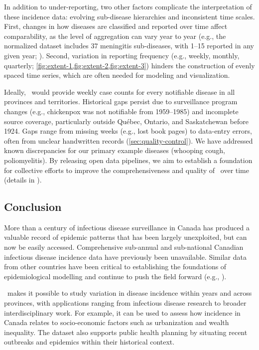 \documentclass[12pt]{article}
\begin{document}
In addition to under-reporting, two other factors complicate the interpretation of these incidence data: evolving sub-disease hierarchies and inconsistent time scales. First, changes in how diseases are classified and reported over time affect comparability, as the level of aggregation can vary year to year (e.g., the normalized dataset includes 37 meningitis sub-diseases, with 1--15 reported in any given year; ). Second, variation in reporting frequency (e.g., weekly, monthly, quarterly; \cref{fig:extent-1,fig:extent-2,fig:extent-3}) hinders the construction of evenly spaced time series, which are often needed for modeling and visualization.

Ideally, \datacronym\ would provide weekly case counts for every notifiable \cite{doherty2000establishing} disease in all provinces and territories. Historical gaps persist due to surveillance program changes (e.g., chickenpox was not notifiable from 1959--1985) and incomplete source coverage, particularly outside Québec, Ontario, and Saskatchewan before 1924. Gaps range from missing weeks (e.g., lost book pages) to data-entry errors, often from unclear handwritten records (\cref{sec:quality-control}). We have addressed known discrepancies for our primary example diseases (whooping cough, poliomyelitis). By releasing open data pipelines, we aim to establish a foundation for collective efforts to improve the comprehensiveness and quality of \datacronym\ over time (details in ).

\subsection{Conclusion}

More than a century of infectious disease surveillance in Canada has produced a valuable record of epidemic patterns that has been largely unexploited, but can now be easily accessed. Comprehensive sub-annual and sub-national Canadian infectious disease incidence data have previously been unavailable. Similar data from other countries have been critical to establishing the foundations of epidemiological modelling and continue to push the field forward (e.g., \cite{bartlett1960critical,london1973recurrent,anderson1982directly,fine1982measles,grenfell1985pertussis}).

\datacronym\ makes it possible to study variation in disease incidence within years and across provinces, with applications ranging from infectious disease research to broader interdisciplinary work. For example, it can be used to assess how incidence in Canada relates to socio-economic factors such as urbanization and wealth inequality. The dataset also supports public health planning by situating recent outbreaks and epidemics within their historical context.
\end{document}
